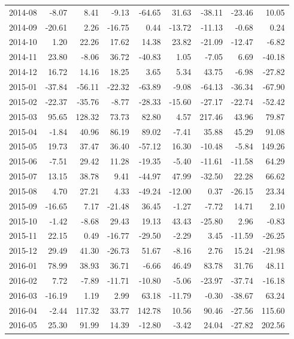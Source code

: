 \begin{table}[ht]
\begin{tabular}{lrrrrrrrr}
  2014-08 & -8.07 & 8.41 & -9.13 & -64.65 & 31.63 & -38.11 & -23.46 & 10.05 \\ 
  2014-09 & -20.61 & 2.26 & -16.75 & 0.44 & -13.72 & -11.13 & -0.68 & 0.24 \\ 
  2014-10 & 1.20 & 22.26 & 17.62 & 14.38 & 23.82 & -21.09 & -12.47 & -6.82 \\ 
  2014-11 & 23.80 & -8.06 & 36.72 & -40.83 & 1.05 & -7.05 & 6.69 & -40.18 \\ 
  2014-12 & 16.72 & 14.16 & 18.25 & 3.65 & 5.34 & 43.75 & -6.98 & -27.82 \\ 
  2015-01 & -37.84 & -56.11 & -22.32 & -63.89 & -9.08 & -64.13 & -36.34 & -67.90 \\ 
  2015-02 & -22.37 & -35.76 & -8.77 & -28.33 & -15.60 & -27.17 & -22.74 & -52.42 \\ 
  2015-03 & 95.65 & 128.32 & 73.73 & 82.80 & 4.57 & 217.46 & 43.96 & 79.87 \\ 
  2015-04 & -1.84 & 40.96 & 86.19 & 89.02 & -7.41 & 35.88 & 45.29 & 91.08 \\ 
  2015-05 & 19.73 & 37.47 & 36.40 & -57.12 & 16.30 & -10.48 & -5.84 & 149.26 \\ 
  2015-06 & -7.51 & 29.42 & 11.28 & -19.35 & -5.40 & -11.61 & -11.58 & 64.29 \\ 
  2015-07 & 13.15 & 38.78 & 9.41 & -44.97 & 47.99 & -32.50 & 22.28 & 66.62 \\ 
  2015-08 & 4.70 & 27.21 & 4.33 & -49.24 & -12.00 & 0.37 & -26.15 & 23.34 \\ 
  2015-09 & -16.65 & 7.17 & -21.48 & 36.45 & -1.27 & -7.72 & 14.71 & 2.10 \\ 
  2015-10 & -1.42 & -8.68 & 29.43 & 19.13 & 43.43 & -25.80 & 2.96 & -0.83 \\ 
  2015-11 & 22.15 & 0.49 & -16.77 & -29.50 & -2.29 & 3.45 & -11.59 & -26.25 \\ 
  2015-12 & 29.49 & 41.30 & -26.73 & 51.67 & -8.16 & 2.76 & 15.24 & -21.98 \\ 
  2016-01 & 78.99 & 38.93 & 36.71 & -6.66 & 46.49 & 83.78 & 31.76 & 48.11 \\ 
  2016-02 & 7.72 & -7.89 & -11.71 & -10.80 & -5.06 & -23.97 & -37.74 & -16.18 \\ 
  2016-03 & -16.19 & 1.19 & 2.99 & 63.18 & -11.79 & -0.30 & -38.67 & 63.24 \\ 
  2016-04 & -2.44 & 117.32 & 33.77 & 142.78 & 10.56 & 90.46 & -27.56 & 115.60 \\ 
  2016-05 & 25.30 & 91.99 & 14.39 & -12.80 & -3.42 & 24.04 & -27.82 & 202.56 \\ 

\end{tabular}
\end{table}
